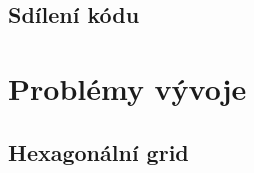 \subsection{Sdílení kódu}
\label{subsec:implementation-collaboration-sharing}

\section{Problémy vývoje}
\label{sec:implementation-problems}

\subsection*{Hexagonální grid}
\label{subsec:implementation-problems-hexagon}

%

\endinput